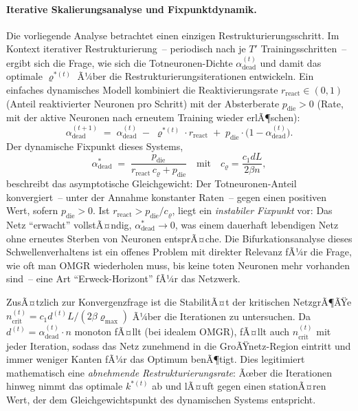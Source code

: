 ﻿\documentclass[12pt, a4paper, openany]{report}
\begin{document}
\paragraph{Iterative Skalierungsanalyse und Fixpunktdynamik.}
Die vorliegende Analyse betrachtet einen einzigen Restrukturierungsschritt.
Im Kontext iterativer Restrukturierung~-- periodisch nach je $T'$
Trainingsschritten~-- ergibt sich die Frage, wie sich die Totneuronen-Dichte
$\alpha_{\mathrm{dead}}^{(t)}$ und damit das optimale $\varrho^{*(t)}$ Ã¼ber
die Restrukturierungsiterationen entwickeln.  Ein einfaches dynamisches
Modell kombiniert die Reaktivierungsrate $r_{\mathrm{react}} \in (0,1)$
(Anteil reaktivierter Neuronen pro Schritt) mit der Absterberate
$p_{\mathrm{die}} > 0$ (Rate, mit der aktive Neuronen nach erneutem Training
wieder erlÃ¶schen):
\[
  \alpha_{\mathrm{dead}}^{(t+1)}
  \;=\;
  \alpha_{\mathrm{dead}}^{(t)}
  \;-\; \varrho^{*(t)} \cdot r_{\mathrm{react}}
  \;+\; p_{\mathrm{die}} \cdot \bigl(1 - \alpha_{\mathrm{dead}}^{(t)}\bigr).
\]
Der dynamische Fixpunkt dieses Systems,
\[
  \alpha^*_{\mathrm{dead}}
  \;=\; \frac{p_{\mathrm{die}}}{r_{\mathrm{react}}\,c_\varrho + p_{\mathrm{die}}}
  \quad \text{mit}\quad
  c_\varrho = \frac{c_1 d L}{2\beta n},
\]
beschreibt das asymptotische Gleichgewicht: Der Totneuronen-Anteil
konvergiert~-- unter der Annahme konstanter Raten~-- gegen einen positiven
Wert, sofern $p_{\mathrm{die}} > 0$.  Ist $r_{\mathrm{react}} > p_{\mathrm{die}}/c_\varrho$,
liegt ein \emph{instabiler Fixpunkt} vor: Das Netz ``erwacht'' vollstÃ¤ndig,
$\alpha^*_{\mathrm{dead}} \to 0$, was einem dauerhaft lebendigen Netz ohne
erneutes Sterben von Neuronen entsprÃ¤che.    Die Bifurkationsanalyse dieses
Schwellenverhaltens ist ein offenes Problem mit direkter Relevanz fÃ¼r die
Frage, wie oft man OMGR wiederholen muss, bis keine toten Neuronen mehr
vorhanden sind~-- eine Art ``Erweck-Horizont'' fÃ¼r das Netzwerk.

ZusÃ¤tzlich zur Konvergenzfrage ist die StabilitÃ¤t der kritischen NetzgrÃ¶ÃŸe
$n_{\mathrm{crit}}^{(t)} = c_1 d^{(t)} L / (2\beta\varrho_{\max})$ Ã¼ber die
Iterationen zu untersuchen.  Da $d^{(t)} = \alpha_{\mathrm{dead}}^{(t)} \cdot n$
monoton fÃ¤llt (bei idealem OMGR), fÃ¤llt auch $n_{\mathrm{crit}}^{(t)}$ mit
jeder Iteration, sodass das Netz zunehmend in die GroÃŸnetz-Region eintritt
und immer weniger Kanten fÃ¼r das Optimum benÃ¶tigt.  Dies legitimiert
mathematisch eine \emph{abnehmende Restrukturierungsrate}: Ãœber die
Iterationen hinweg nimmt das optimale $k^{*(t)}$ ab und lÃ¤uft gegen einen
stationÃ¤ren Wert, der dem Gleichgewichtspunkt des dynamischen Systems entspricht.
\end{document}
